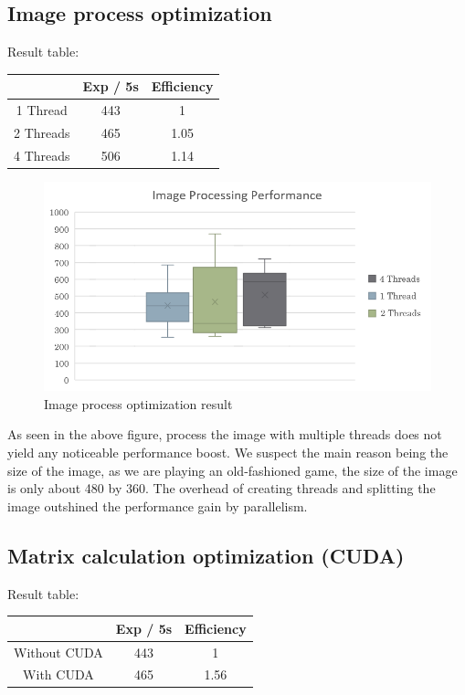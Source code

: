 \documentclass[sigconf]{acmart}
\begin{document}
\subsection{Image process optimization}
Result table:
\begin{center}
  \begin{tabular}{ |c|c|c| } 
   \hline
    & Exp / 5s & Efficiency \\ 
   \hline
   1 Thread & 443 & 1 \\ 
   \hline
   2 Threads & 465 & 1.05 \\ 
   \hline
   4 Threads & 506 & 1.14 \\ 
   \hline
  \end{tabular}
\end{center}

\begin{figure}[h]
  \centering
  \includegraphics[width=\columnwidth]{img_r.png}
  \caption{Image process optimization result}
\end{figure}
As seen in the above figure, process the image with multiple threads does not yield any noticeable performance boost. We suspect the main reason being the size of the image, as we are playing an old-fashioned game, the size of the image is only about 480 by 360. The overhead of creating threads and splitting the image outshined the performance gain by parallelism.

\subsection{Matrix calculation optimization (CUDA)}
Result table:
\begin{center}
  \begin{tabular}{ |c|c|c| } 
   \hline
    & Exp / 5s & Efficiency \\ 
   \hline
   Without CUDA & 443 & 1 \\ 
   \hline
   With CUDA & 465 & 1.56 \\ 
   \hline
  \end{tabular}
\end{center}
\end{document}
